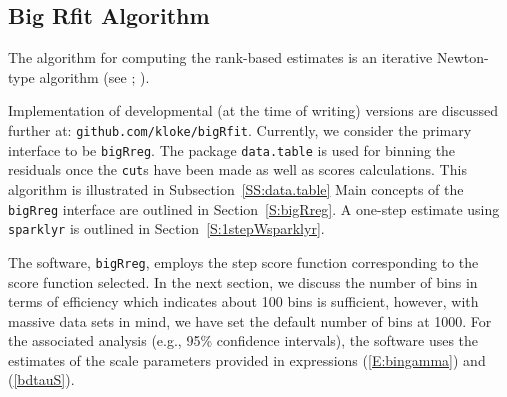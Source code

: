\subsection{Big Rfit Algorithm}
\label{sect:BigRfit}
The algorithm for computing the rank-based estimates is an iterative Newton-type algorithm (see \citet*{bigRfitpaper}; \citet{hm11}).

Implementation of developmental (at the time of writing) versions are discussed further at: 
 \verb|github.com/kloke/bigRfit|.
Currently, we consider the primary interface to be \verb|bigRreg|.
The package
\texttt{data.table} \citep{data.table}
is used for binning the residuals once the \verb|cut|s have been made as well as scores calculations. 
This algorithm is illustrated in Subsection~\ref{SS:data.table}
Main concepts of the \verb|bigRreg| interface are outlined in Section~\ref{S:bigRreg}.
A one-step estimate using 
\texttt{sparklyr} \citep*{sparklyr}
is outlined in Section~\ref{S:1stepWsparklyr}.

The software, \verb|bigRreg|, employs the step score function corresponding to the score function selected.
In the next section, we discuss the number of bins in terms of efficiency which indicates about 100 bins is sufficient, however,
with massive data sets in mind, we have set the default number of bins at 1000.
For the associated analysis (e.g., 95\% confidence intervals), the software uses the estimates of the scale parameters provided in expressions (\ref{E:bingamma}) and (\ref{bdtauS}).


